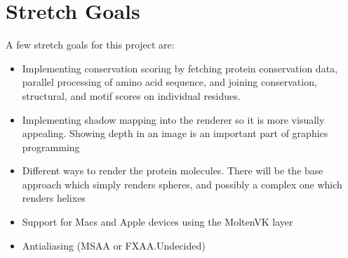 \documentclass[12pt]{article}
\begin{document}
	\section*{Stretch Goals}

	A few stretch goals for this project are:

	\begin{itemize}[noitemsep]
		\item Implementing conservation scoring by fetching protein conservation
			data, parallel processing of amino acid sequence, and joining
			conservation, structural, and motif scores on individual residues.
		\item Implementing shadow mapping into the renderer so it is more visually
			appealing. Showing depth in an image is an important part of graphics
			programming
		\item Different ways to render the protein molecules. There will be the
			base approach which simply renders spheres, and possibly a complex
			one which renders helixes
		\item Support for Macs and Apple devices using the MoltenVK layer
		\item Antialiasing (MSAA or FXAA.Undecided)
	\end{itemize}
\end{document}
